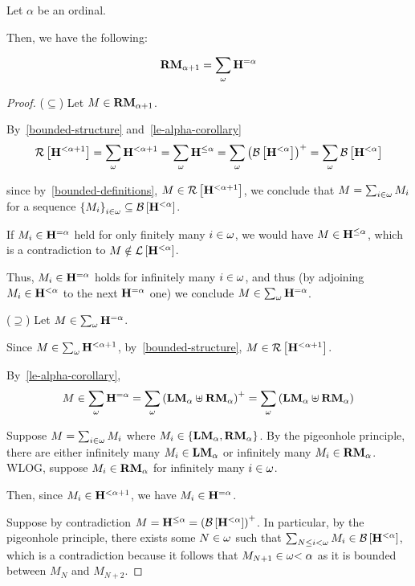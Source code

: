 \begin{lemma}\label{rmj-successor-decomposition}
  Let $\alpha$ be an ordinal.

  Then, we have the following:

  \[
    \mathbf{RM}_{\alpha + 1} = \sum_{\omega}{\mathbf{H}_{}^{= \alpha}}
  \]
\end{lemma}

\begin{proof}
  ($\subseteq$) Let $M \in \mathbf{RM}_{\alpha + 1}$.

  By~\cref{bounded-structure} and~\cref{le-alpha-corollary}
  \[
    \mathcal{R} \left[ {{\mathbf{H}_{}^{< \alpha + 1}}} \right]
    = \sum_{\omega}{\mathbf{H}_{}^{< \alpha + 1}}
    = \sum_{\omega}{\mathbf{H}_{}^{\le \alpha}}
    = \sum_{\omega}{\left( {\mathcal{B} \left[ {{\mathbf{H}_{}^{< \alpha}}} \right]} \right)^+}
    = \sum_{\omega}{\mathcal{B} \left[ {{\mathbf{H}_{}^{< \alpha}}} \right]}
  \]

  since by~\cref{bounded-definitions}, $M \in \mathcal{R} \left[ {{\mathbf{H}_{}^{< \alpha + 1}}} \right]$,
  we conclude that $M = \sum_{i \in \omega}{M_i}$ for a sequence
  $\left\{ {M_i} \right\}_{i \in \omega} \subseteq \mathcal{B} \left[ {{\mathbf{H}_{}^{< \alpha}}} \right]$.

  If $M_i \in \mathbf{H}_{}^{= \alpha}$ held for only finitely many $i \in \omega$,
  we would have $M \in \mathbf{H}_{}^{\le \alpha}$, which is a contradiction
  to $M \notin \mathcal{L} \left[ {{\mathbf{H}_{}^{< \alpha}}} \right]$.

  Thus, $M_i \in \mathbf{H}_{}^{= \alpha}$ holds
  for infinitely many $i \in \omega$, and thus (by adjoining $M_i \in \mathbf{H}_{}^{< \alpha}$
  to the next $\mathbf{H}_{}^{= \alpha}$ one) we conclude $M \in \sum_{\omega}{\mathbf{H}_{}^{= \alpha}}$.

  ($\supseteq$) Let $M \in \sum_{\omega}{\mathbf{H}_{}^{= \alpha}}$.

  Since $M \in \sum_{\omega} {\mathbf{H}_{}^{< \alpha + 1}}$, by~\cref{bounded-structure},
  $M \in \mathcal{R} \left[ {{\mathbf{H}_{}^{< \alpha + 1}}} \right]$.

  By~\cref{le-alpha-corollary},
  \[
    M \in \sum_{\omega}{\mathbf{H}_{}^{= \alpha}}
    = \sum_{\omega} \left( { \mathbf{LM}_{\alpha} \uplus \mathbf{RM}_{\alpha} } \right)^+
    = \sum_{\omega} \left( { \mathbf{LM}_{\alpha} \uplus \mathbf{RM}_{\alpha} } \right)
  \]

  Suppose $M = \sum_{i \in \omega}{M_i}$ where $M_i \in \left\{ {\mathbf{LM}_{\alpha}, \mathbf{RM}_{\alpha}} \right\}$.
  By the pigeonhole principle, there are either
  infinitely many $M_i \in \mathbf{LM}_{\alpha}$ or infinitely many $M_i \in \mathbf{RM}_{\alpha}$.
  WLOG, suppose $M_i \in \mathbf{RM}_{\alpha}$ for infinitely many $i \in \omega$.

  Then, since $M_i \in \mathbf{H}_{}^{< \alpha + 1}$, we have $M_i \in \mathbf{H}_{}^{= \alpha}$.

  Suppose by contradiction $M = \mathbf{H}_{}^{\le \alpha} = \left( {\mathcal{B} \left[ {{\mathbf{H}_{}^{< \alpha}}} \right]} \right)^+$.
  In particular, by the pigeonhole principle, there exists some $N \in \omega$
  such that $\sum_{N \le i < \omega} M_i \in \mathcal{B} \left[ {{\mathbf{H}_{}^{< \alpha}}} \right]$,
  which is a contradiction because it follows that $M_{N+1} \in \omega{< \alpha}$ as it is bounded
  between $M_N$ and $M_{N+2}$.
\end{proof}

